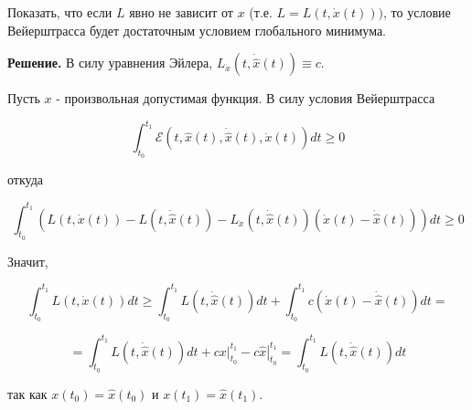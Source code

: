 \begin{task}

    
    Показать, что если $L$ явно не зависит от $x$ (т.е. $L=L(t, \dot{x}(t)))$, то условие Вейерштрасса будет достаточным условием глобального минимума.

    \textbf{Решение.} В силу уравнения Эйлера, $L_{\dot{x}}(t, \dot{\hat{x}}(t)) \equiv c$.
    
    Пусть $x$ - произвольная допустимая функция. В силу условия Вейерштрасса
    
    $$
    \int_{t_{0}}^{t_{1}} \mathcal{E}(t, \hat{x}(t), \dot{\hat{x}}(t), \dot{x}(t)) d t \geq 0
    $$
    
    откуда
    
    $$
    \int_{t_{0}}^{t_{1}}\left(L(t, \dot{x}(t))-L(t, \dot{\hat{x}}(t))-L_{\dot{x}}(t, \dot{\hat{x}}(t))(\dot{x}(t)-\dot{\hat{x}}(t))\right) d t \geq 0
    $$
    
    Значит,
    
    $$
    \int_{t_{0}}^{t_{1}} L(t, \dot{x}(t)) d t \geq \int_{t_{0}}^{t_{1}} L(t, \dot{\hat{x}}(t)) d t+\int_{t_{0}}^{t_{1}} c(\dot{x}(t)-\dot{\hat{x}}(t)) d t=
    $$
    
    $$
    =\int_{t_{0}}^{t_{1}} L(t, \dot{\hat{x}}(t)) d t+\left.c x\right|_{t_{0}} ^{t_{1}}-\left.c \hat{x}\right|_{t_{0}} ^{t_{1}}=\int_{t_{0}}^{t_{1}} L(t, \dot{\hat{x}}(t)) d t
    $$
    
    так как $x\left(t_{0}\right)=\hat{x}\left(t_{0}\right)$ и $x\left(t_{1}\right)=\hat{x}\left(t_{1}\right)$.
    
\end{task}